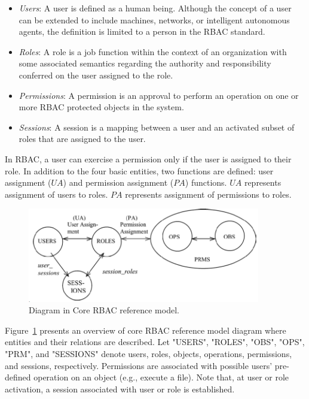 \begin{itemize}
\setlength{\itemsep}{0.25pt}
\item \emph{Users}: A user is defined as a human being. Although the concept of a user can be extended to include machines, networks, or intelligent autonomous agents, the definition is limited to a person in the RBAC standard. 
\item \emph{Roles}: A role is a job function within the context of an organization with some associated semantics regarding the authority and responsibility conferred on the user assigned to the role.
\item \emph{Permissions}: A permission is an approval to perform an operation on one or more RBAC protected objects in the system.
\item \emph{Sessions}: A session is a mapping between a user and an activated subset of roles that are assigned to the user.
\end{itemize}

In RBAC, a user can exercise a permission only if the user is assigned to their role.
In addition to the four basic entities, two functions are defined:
user assignment ($UA$) and permission assignment ($PA$) functions.
$UA$ represents assignment of users to roles.
$PA$ represents assignment of permissions to roles.

\begin{figure}[ht]
    \centering
        \includegraphics[width=4.0in]{sections/core-model.png}
    \caption{\label{fig:overview}Diagram in Core RBAC reference model\cite{ferraiolokuhn}.}
\end{figure}

Figure~\ref{fig:overview} presents an overview of core RBAC reference model diagram where entities and their relations are described.
Let "USERS", "ROLES", "OBS", "OPS", "PRM", and "SESSIONS" denote users, roles, objects, operations, permissions, and sessions, respectively.
Permissions are associated with possible users' pre-defined operation on an object (e.g., execute a file).
Note that, at user or role activation, a session associated with user or role is established.


